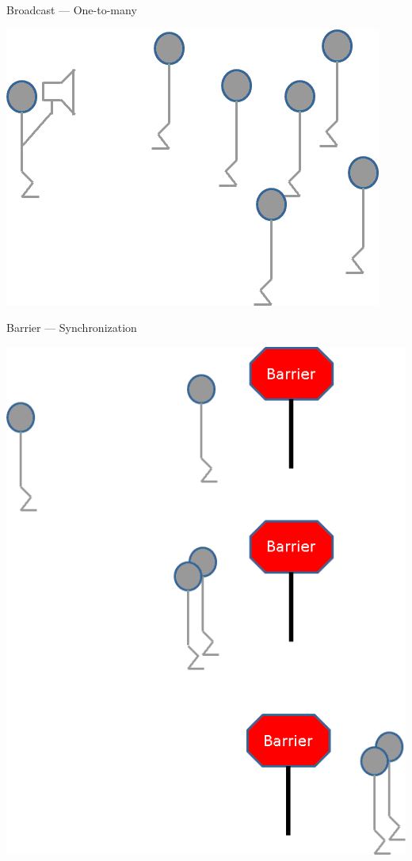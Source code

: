 \begin{frame}
  \begin{block}{Broadcast --- One-to-many}
    \begin{center}
      \includegraphics[scale=.6]{pics/mpi_bcast}
    \end{center}
  \end{block}
\end{frame}


\begin{frame}
  \begin{block}{Barrier --- Synchronization}
    \begin{center}
      \includegraphics[scale=.38]{pics/mpi_barrier}
    \end{center}
  \end{block}
\end{frame}



